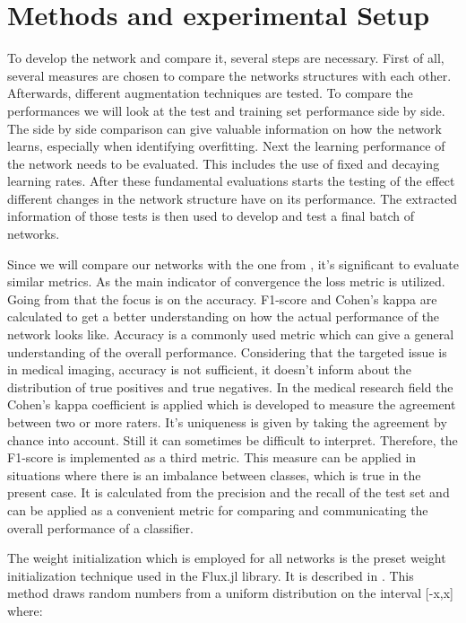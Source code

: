 \documentclass[
a4paper, 
12pt,
grayscalebody, %
abstract=on,
twoside, BCOR10mm, 12pt, DIV13,headinclude, footexclude, final, abstracton, openright
]{ibireprt}
\numberwithin{equation}{chapter}
\numberwithin{table}{chapter}
\numberwithin{figure}{chapter}
\numberwithin{algorithm}{chapter}
\numberwithin{example}{chapter}
\numberwithin{example}{chapter}
\begin{document}
\chapter{Methods and experimental Setup }

To develop the network and compare it, several steps are necessary. First of all, several measures are chosen to compare the networks structures with each other. Afterwards, different augmentation techniques are tested. To compare the performances we will look at the test and training set performance side by side. The side by side comparison can give valuable information on how the network learns, especially when identifying overfitting. Next the learning performance of the network needs to be evaluated. This includes the use of fixed and decaying learning rates. After these fundamental evaluations starts the testing of the effect different changes in the network structure have on its performance. The extracted information of those tests is then used to develop and test a final batch of networks.

Since we will compare our networks with the one from \cite{Walle2023}, it's significant to evaluate similar metrics. As the main indicator of convergence the loss metric is utilized. Going from that the focus is on the accuracy. F1-score and Cohen's kappa are calculated to get a better understanding on how the actual performance of the network looks like. Accuracy is a commonly used metric which can give a general understanding of the overall performance. Considering that the targeted issue is in medical imaging, accuracy is not sufficient, it doesn't inform about the distribution of true positives and true negatives. In the medical research field the Cohen's kappa coefficient is applied which is developed to measure the agreement between two or more raters. It's uniqueness is given by taking the agreement by chance into account. Still it can sometimes be difficult to interpret. 
Therefore, the F1-score is implemented as a third metric. This measure can be applied in situations where there is an imbalance between classes, which is true in the present case. It is calculated from the precision and the recall of the test set and can  be applied as a convenient metric for comparing and communicating the overall performance of a classifier. 

The weight initialization which is employed for all networks is the preset weight initialization technique used in the Flux.jl library. It  is described in \cite{glorot2010}. This method draws random numbers from a uniform distribution on the interval [-x,x] where:
\end{document}
